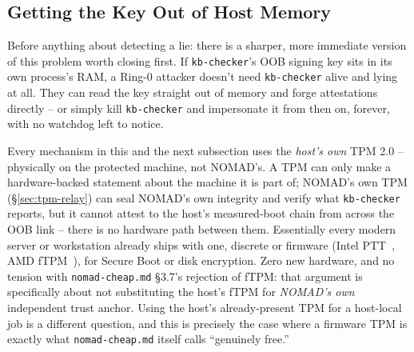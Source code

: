 \documentclass[11pt,a4paper]{article}
\begin{document}
\subsection{Getting the Key Out of Host Memory}
\label{sec:key-in-tpm}

Before anything about detecting a lie: there is a sharper, more
immediate version of this problem worth closing first. If
\texttt{kb-checker}'s OOB signing key sits in its own process's RAM, a
Ring-0 attacker doesn't need \texttt{kb-checker} alive and lying at
all. They can read the key straight out of memory and forge
attestations directly -- or simply kill \texttt{kb-checker} and
impersonate it from then on, forever, with no watchdog left to notice.

\begin{notebox}
Every mechanism in this and the next subsection uses the \emph{host's
own} TPM 2.0 -- physically on the protected machine, not NOMAD's. A TPM
can only make a hardware-backed statement about the machine it is
part of; NOMAD's own TPM (\S\ref{sec:tpm-relay}) can seal NOMAD's own
integrity and verify what \texttt{kb-checker} reports, but it cannot
attest to the host's measured-boot chain from across the OOB link --
there is no hardware path between them. Essentially every modern
server or workstation already ships with one, discrete or firmware
(Intel PTT~\cite{intelptt}, AMD fTPM~\cite{amdftpm}), for Secure Boot or disk encryption. Zero new
hardware, and no tension with \texttt{nomad-cheap.md} \S3.7's rejection
of fTPM: that argument is specifically about not substituting the
host's fTPM for \emph{NOMAD's own} independent trust anchor. Using the
host's already-present TPM for a host-local job is a different
question, and this is precisely the case where a firmware TPM is
exactly what \texttt{nomad-cheap.md} itself calls ``genuinely free.''
\end{notebox}
\end{document}
